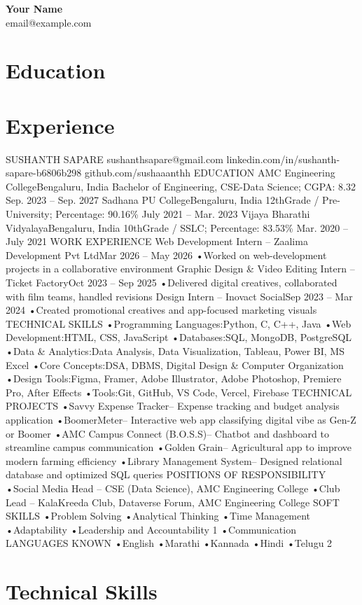 \documentclass[11pt,a4paper]{article}
\begin{document}
\pagestyle{empty}

{\Huge \textcolor{primary}{\textbf{Your Name}}} \\
\vspace{1mm}
{\large email@example.com}
\vspace{4mm}

\section*{\textcolor{primary}{Education}}
\noindent 

\section*{\textcolor{primary}{Experience}}
\noindent SUSHANTH SAPARE sushanthsapare@gmail.com linkedin.com/in/sushanth-sapare-b6806b298 github.com/sushaaanthh EDUCATION AMC Engineering CollegeBengaluru, India Bachelor of Engineering, CSE-Data Science; CGPA: 8.32 Sep. 2023 – Sep. 2027 Sadhana PU CollegeBengaluru, India 12thGrade / Pre-University; Percentage: 90.16\% July 2021 – Mar. 2023 Vijaya Bharathi VidyalayaBengaluru, India 10thGrade / SSLC; Percentage: 83.53\% Mar. 2020 – July 2021 WORK EXPERIENCE Web Development Intern – Zaalima Development Pvt LtdMar 2026 – May 2026 •Worked on web-development projects in a collaborative environment Graphic Design \& Video Editing Intern – Ticket FactoryOct 2023 – Sep 2025 •Delivered digital creatives, collaborated with film teams, handled revisions Design Intern – Inovact SocialSep 2023 – Mar 2024 •Created promotional creatives and app-focused marketing visuals TECHNICAL SKILLS •Programming Languages:Python, C, C++, Java •Web Development:HTML, CSS, JavaScript •Databases:SQL, MongoDB, PostgreSQL •Data \& Analytics:Data Analysis, Data Visualization, Tableau, Power BI, MS Excel •Core Concepts:DSA, DBMS, Digital Design \& Computer Organization •Design Tools:Figma, Framer, Adobe Illustrator, Adobe Photoshop, Premiere Pro, After Effects •Tools:Git, GitHub, VS Code, Vercel, Firebase TECHNICAL PROJECTS •Savvy Expense Tracker– Expense tracking and budget analysis application •BoomerMeter– Interactive web app classifying digital vibe as Gen-Z or Boomer •AMC Campus Connect (B.O.S.S)– Chatbot and dashboard to streamline campus communication •Golden Grain– Agricultural app to improve modern farming efficiency •Library Management System– Designed relational database and optimized SQL queries POSITIONS OF RESPONSIBILITY •Social Media Head – CSE (Data Science), AMC Engineering College •Club Lead – KalaKreeda Club, Dataverse Forum, AMC Engineering College SOFT SKILLS •Problem Solving •Analytical Thinking •Time Management •Adaptability •Leadership and Accountability 1 •Communication LANGUAGES KNOWN •English •Marathi •Kannada •Hindi •Telugu 2

\section*{\textcolor{primary}{Technical Skills}}
\begin{itemize}
\end{itemize}
\end{document}
